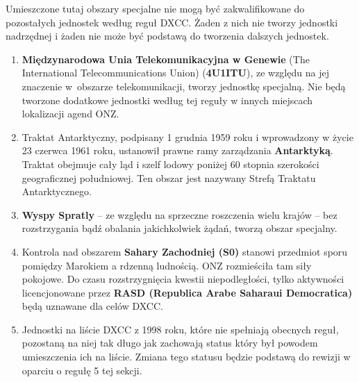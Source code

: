 \documentclass[]{mgr}
\begin{document}
\begin{enumerate}
                Umieszczone tutaj obszary specjalne nie mogą być zakwalifikowane do pozostałych jednostek według reguł DXCC. Żaden z nich nie tworzy jednostki nadrzędnej i żaden nie może być podstawą do tworzenia dalszych jednostek.
                \begin{enumerate}
                    \item \textbf{Międzynarodowa Unia Telekomunikacyjna w Genewie} (The International Telecommunications Union) (\textbf{4U1ITU}), ze względu na jej znaczenie w~obszarze telekomunikacji, tworzy jednostkę specjalną. Nie będą tworzone dodatkowe jednostki według tej reguły w innych miejscach lokalizacji agend ONZ.
                    \item Traktat Antarktyczny, podpisany 1 grudnia 1959 roku i wprowadzony w życie 23 czerwca 1961 roku, ustanowił prawne ramy zarządzania \textbf{Antarktyką}. Traktat obejmuje cały ląd i szelf lodowy poniżej 60 stopnia szerokości geograficznej południowej. Ten obszar jest nazywany Strefą Traktatu Antarktycznego.
                    \item \textbf{Wyspy Spratly} – ze względu na sprzeczne roszczenia wielu krajów – bez rozstrzygania bądź obalania jakichkolwiek żądań, tworzą obszar specjalny.
                    \item Kontrola nad obszarem \textbf{Sahary Zachodniej (S0)} stanowi przedmiot sporu pomiędzy Marokiem a rdzenną ludnością. ONZ rozmieściła tam siły pokojowe. Do czasu rozstrzygnięcia kwestii niepodległości, tylko aktywności licencjonowane przez \textbf{RASD (Republica Arabe Saharaui Democratica)} będą uznawane dla celów DXCC.
                    \item Jednostki na liście DXCC z 1998 roku, które nie spełniają obecnych reguł, pozostaną na niej tak długo jak zachowają status który był powodem umieszczenia ich na liście. Zmiana tego statusu będzie podstawą do rewizji w oparciu o regułę 5 tej sekcji.
                \end{enumerate}


\end{enumerate}
\end{document}
